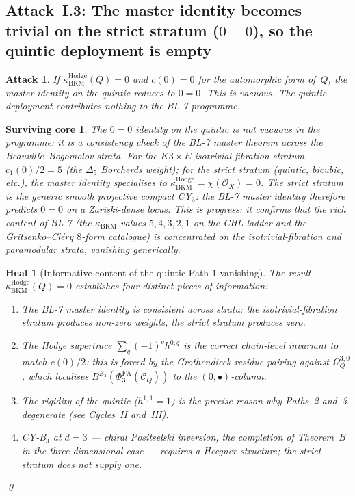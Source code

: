 \documentclass[11pt]{amsart}
\newtheorem{attack}[theorem]{Attack}
\newtheorem{surviving}[theorem]{Surviving core}
\newtheorem{heal}[theorem]{Heal}
\providecommand{\cC}{\mathcal{C}}
\providecommand{\cO}{\mathcal{O}}
\providecommand{\PhiFA}{\Phi^{\mathrm{FA}}}
\providecommand{\kBKM}{\kappa_{\mathrm{BKM}}}
\providecommand{\Hdg}{\mathrm{Hodge}}
\begin{document}
\subsection{Attack~I.3: The master identity becomes trivial on the
strict stratum ($0 = 0$), so the quintic deployment is empty}

\begin{attack}
\label{att:trivial-zero}
If $\kBKM^{\Hdg}(Q) = 0$ and $c(0) = 0$ for the automorphic form
of~$Q$, the master identity on the quintic reduces to $0 = 0$. This
is vacuous. The quintic deployment contributes nothing to the BL-7
programme.
\end{attack}

\begin{surviving}
\label{surv:vacuous-is-informative}
The $0 = 0$ identity on the quintic is \emph{not} vacuous in the
programme: it is a \emph{consistency check} of the BL-7 master
theorem across the Beauville--Bogomolov strata. For the
$K3 \times E$ isotrivial-fibration stratum, $c_1(0) / 2 = 5$
(the $\Delta_5$ Borcherds weight); for the strict stratum (quintic,
bicubic, etc.), the master identity specialises to
$\kBKM^{\Hdg} = \chi(\cO_X) = 0$. The strict stratum is the
generic smooth projective compact CY$_3$: the BL-7 master identity
therefore predicts $0 = 0$ on a Zariski-dense locus. This is
\emph{progress}: it confirms that the rich content of BL-7 (the
$\kBKM$-values $5, 4, 3, 2, 1$ on the CHL ladder and the
Gritsenko--Cl\'ery $8$-form catalogue) is \emph{concentrated} on
the isotrivial-fibration and paramodular strata, vanishing
generically.
\end{surviving}

\begin{heal}[Informative content of the quintic Path-$1$ vanishing]
\label{heal:informative-zero}
The result $\kBKM^{\Hdg}(Q) = 0$ establishes four distinct
pieces of information:
\begin{enumerate}[label=(\roman*)]
\item The BL-7 master identity is consistent across strata: the
isotrivial-fibration stratum produces non-zero weights, the
strict stratum produces zero.
\item The Hodge supertrace $\sum_q (-1)^q h^{0,q}$ is the correct
chain-level invariant to match $c(0)/2$: this is forced by the
Grothendieck-residue pairing against $\Omega_Q^{3,0}$, which
localises $B^{E_3}(\PhiFA_3(\cC_Q))$ to the
$(0, \bullet)$-column.
\item The rigidity of the quintic ($h^{1,1} = 1$) is the precise
reason why Paths~2 and~3 degenerate (see Cycles~II and~III).
\item CY-B$_3$ at $d = 3$ --- chiral Positselski inversion, the
completion of Theorem~B in the three-dimensional case ---
requires a Heegner structure; the strict stratum does not
supply one.
\end{enumerate}
\qed
\end{heal}
\end{document}
